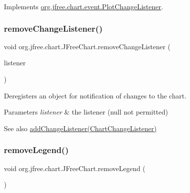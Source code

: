 Implements \mbox{\hyperlink{interfaceorg_1_1jfree_1_1chart_1_1event_1_1_plot_change_listener_aff1bdd2cc91287021b58a2ae67aa159d}{org.\+jfree.\+chart.\+event.\+Plot\+Change\+Listener}}.

\mbox{\label{classorg_1_1jfree_1_1chart_1_1_j_free_chart_ab975fd93d4df150231ac1e413bae9c33}} 
\subsubsection{\texorpdfstring{remove\+Change\+Listener()}{removeChangeListener()}}
{\footnotesize\ttfamily void org.\+jfree.\+chart.\+J\+Free\+Chart.\+remove\+Change\+Listener (\begin{DoxyParamCaption}\item[{\mbox{\hyperlink{interfaceorg_1_1jfree_1_1chart_1_1event_1_1_chart_change_listener}{Chart\+Change\+Listener}}}]{listener }\end{DoxyParamCaption})}

Deregisters an object for notification of changes to the chart.


\begin{DoxyParams}{Parameters}
{\em listener} & the listener ({\ttfamily null} not permitted)\\
\hline
\end{DoxyParams}
\begin{DoxySeeAlso}{See also}
\mbox{\hyperlink{classorg_1_1jfree_1_1chart_1_1_j_free_chart_a675caacf5e368015181026f6acb3e8c7}{add\+Change\+Listener(\+Chart\+Change\+Listener)}} 
\end{DoxySeeAlso}
\mbox{\label{classorg_1_1jfree_1_1chart_1_1_j_free_chart_acde6bda611f15c2f55255a42280b5fd9}} 
\subsubsection{\texorpdfstring{remove\+Legend()}{removeLegend()}}
{\footnotesize\ttfamily void org.\+jfree.\+chart.\+J\+Free\+Chart.\+remove\+Legend (\begin{DoxyParamCaption}{ }\end{DoxyParamCaption})}

